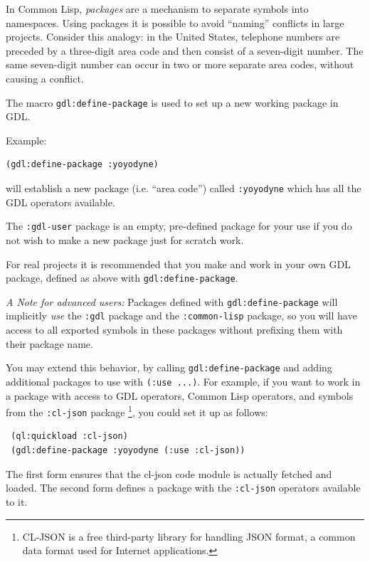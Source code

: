 \documentclass [11pt]{book}
\begin{document}
In Common Lisp, \emph{packages} are a mechanism to separate symbols into
namespaces. Using packages it is possible to avoid ``naming'' conflicts in
large projects. Consider this analogy: in the United States, telephone
numbers are preceded by a three-digit area code and then consist of a
seven-digit number. The same seven-digit number can occur in two or
more separate area codes, without causing a conflict.



The macro \texttt{gdl:define-package} is used to set up a new working package in GDL.



 



Example:

\begin{verbatim}(gdl:define-package :yoyodyne)
\end{verbatim} will establish a new package (i.e. ``area code'')
called \texttt{:yoyodyne} which has all the GDL operators available.



The \texttt{:gdl-user} package is an empty, pre-defined package for your use if
you do not wish to make a new package just for scratch work.



For real projects it is recommended that you make and work in your own
GDL package, defined as above with \texttt{gdl:define-package}.



\emph{A Note for advanced users:} Packages defined with \texttt{gdl:define-package} will implicitly \emph{use} the \texttt{:gdl} package and the \texttt{:common-lisp} package, so you will have access to all exported symbols
  in these packages without prefixing them with their package name.

  You may extend this behavior, by calling \texttt{gdl:define-package} and adding additional packages to use with \texttt{(:use ...)}.  For example, if  you want to work in a package with access to GDL operators,
 Common Lisp operators, and symbols from the \texttt{:cl-json} package \footnote{CL-JSON is a free third-party library for handling JSON format, a common data format used 
for Internet applications.}, you could set it up as follows:

\begin{verbatim} (ql:quickload :cl-json)
 (gdl:define-package :yoyodyne (:use :cl-json))
\end{verbatim}The first form ensures that the cl-json code module is
actually fetched and loaded. The second form defines a package with
the \texttt{:cl-json} operators available to it.
\end{document}
